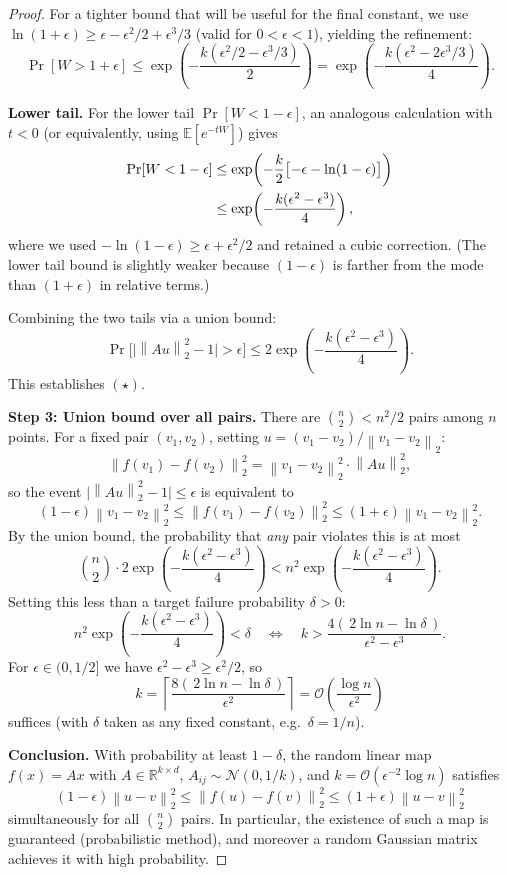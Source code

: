 \documentclass[11pt,a4paper]{article}
\theoremstyle{definition}
\newcommand{\R}{\mathbb{R}}
\newcommand{\calO}{\mathcal{O}}
\newcommand{\norm}[1]{\left\lVert #1 \right\rVert}
\begin{document}
\begin{proof}
For a tighter bound that will be useful for the final constant, we use
$\ln(1+\epsilon) \geq \epsilon - \epsilon^2/2 + \epsilon^3/3$ (valid
for $0 < \epsilon < 1$), yielding the refinement:
\[
  \Pr[W > 1+\epsilon] \leq \exp\!\left(-\frac{k(\epsilon^2/2 - \epsilon^3/3)}{2}\right)
  = \exp\!\left(-\frac{k(\epsilon^2 - 2\epsilon^3/3)}{4}\right).
\]

\medskip
\textbf{Lower tail.}\;
For the lower tail $\Pr[W < 1 - \epsilon]$, an analogous calculation
with $t < 0$ (or equivalently, using $\mathbb{E}[e^{-tW}]$) gives
\begin{align}
  \Pr[W < 1-\epsilon]
  &\leq \exp\!\left(-\frac{k}{2}\bigl[-\epsilon - \ln(1-\epsilon)\bigr]\right) \notag\\
  &\leq \exp\!\left(-\frac{k(\epsilon^2 - \epsilon^3)}{4}\right),
  \label{eq:jl-lower}
\end{align}
where we used $-\ln(1-\epsilon) \geq \epsilon + \epsilon^2/2$ and retained
a cubic correction.  (The lower tail bound is slightly weaker because
$(1-\epsilon)$ is farther from the mode than $(1+\epsilon)$ in relative
terms.)

Combining the two tails via a union bound:
\[
  \Pr\!\bigl[\bigl|\norm{Au}_2^2 - 1\bigr| > \epsilon\bigr]
  \leq 2\exp\!\left(-\frac{k(\epsilon^2 - \epsilon^3)}{4}\right).
\]
This establishes $(\star)$.

\medskip
\textbf{Step 3: Union bound over all pairs.}\;
There are $\binom{n}{2} < n^2/2$ pairs among $n$ points.  For a fixed
pair $(v_1, v_2)$, setting $u = (v_1-v_2)/\norm{v_1-v_2}_2$:
\[
  \norm{f(v_1) - f(v_2)}_2^2 = \norm{v_1 - v_2}_2^2 \cdot \norm{Au}_2^2,
\]
so the event $\bigl|\norm{Au}_2^2 - 1\bigr| \leq \epsilon$ is
equivalent to
\[
  (1-\epsilon)\norm{v_1-v_2}_2^2
  \leq \norm{f(v_1)-f(v_2)}_2^2
  \leq (1+\epsilon)\norm{v_1-v_2}_2^2.
\]
By the union bound, the probability that \emph{any} pair violates this
is at most
\[
  \binom{n}{2} \cdot 2\exp\!\left(-\frac{k(\epsilon^2 - \epsilon^3)}{4}\right)
  < n^2 \exp\!\left(-\frac{k(\epsilon^2 - \epsilon^3)}{4}\right).
\]
Setting this less than a target failure probability $\delta > 0$:
\[
  n^2 \exp\!\left(-\frac{k(\epsilon^2 - \epsilon^3)}{4}\right) < \delta
  \quad\Longleftrightarrow\quad
  k > \frac{4(\,2\ln n - \ln \delta\,)}{\epsilon^2 - \epsilon^3}.
\]
For $\epsilon \in (0, 1/2]$ we have $\epsilon^2 - \epsilon^3 \geq
\epsilon^2/2$, so
\[
  k = \left\lceil \frac{8(\,2\ln n - \ln\delta\,)}{\epsilon^2} \right\rceil
  = \calO\!\left(\frac{\log n}{\epsilon^2}\right)
\]
suffices (with $\delta$ taken as any fixed constant, e.g.\ $\delta = 1/n$).

\medskip
\textbf{Conclusion.}\;
With probability at least $1 - \delta$, the random linear map
$f(x) = Ax$ with $A \in \R^{k \times d}$, \;$A_{ij} \sim
\mathcal{N}(0,1/k)$, and
$k = \calO(\epsilon^{-2}\log n)$
satisfies
\[
  (1-\epsilon)\norm{u-v}_2^2 \leq \norm{f(u)-f(v)}_2^2
  \leq (1+\epsilon)\norm{u-v}_2^2
\]
simultaneously for all $\binom{n}{2}$ pairs.  In particular, the
existence of such a map is guaranteed (probabilistic method), and
moreover a random Gaussian matrix achieves it with high probability.
\end{proof}
\end{document}
